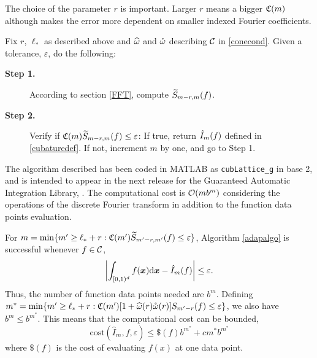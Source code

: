 \documentclass[graybox]{svmult}
\newcommand{\bsx}{\boldsymbol{x}}    %
\begin{document}
The choice of the parameter $r$ is important. Larger $r$ means a bigger $\mathfrak{C}(m)$ although makes the error more dependent on smaller indexed Fourier coefficients.

\begin{algo} \label{adapalgo} Fix $r$, $\ell_*$ as described above and $\widehat{\omega}$ and $\mathring{\omega}$ describing $\mathcal{C}$ in \eqref{conecond}. Given a tolerance, $\varepsilon$, do the following:

\begin{description}
\item[\textbf{Step 1.}] According to section \ref{FFT}, compute $\widetilde{S}_{m-r,m}(f)$.
\item[\textbf{Step 2.}] Verify if $\mathfrak{C}(m)  \widetilde{S}_{m-r,m}(f) \le \varepsilon$: If true, return $\hat{I}_m(f)$ defined in \eqref{cubaturedef}. If not, increment $m$ by one, and go to Step 1.
\end{description}
\end{algo}

The algorithm described has been coded in MATLAB as \texttt{cubLattice\_g} in base 2, and is intended to appear in the next release for the Guaranteed Automatic Integration Library, \cite{ChoEtal14a}.
The computational cost is $\mathcal{O}(m b^m)$ considering the operations of the discrete Fourier transform in addition to the function data points evaluation.

\begin{theorem} \label{adapalgothm} For $m = \min \{m' \ge \ell_*+r : \mathfrak{C}(m')  \widetilde{S}_{m'-r,m'}(f) \le \varepsilon \}$, Algorithm \ref{adapalgo} is successful whenever $f\in\mathcal{C}$,
\[
\biggabs{\int_{\cube} f(\bsx) \D \bsx - \hI_m(f)} \le \varepsilon.
\]
Thus, the number of function data points needed are $b^m$. Defining $m^* = \min \{m' \ge \ell_*+r : \mathfrak{C}(m') [1+ \widehat{\omega}(r) \mathring{\omega}(r)] S_{m'-r}(f) \le \varepsilon \}$, we also have $b^m\leq b^{m^*}$. This means that the computational cost can be bounded,
\[
\mathrm{cost}\left(\widehat{I}_m,f,\varepsilon\right)\leq \$(f)b^{m^*}+cm^*b^{m^*}
\]
where $\$(f)$ is the cost of evaluating $f(x)$ at one data point.
\end{theorem}
\end{document}
